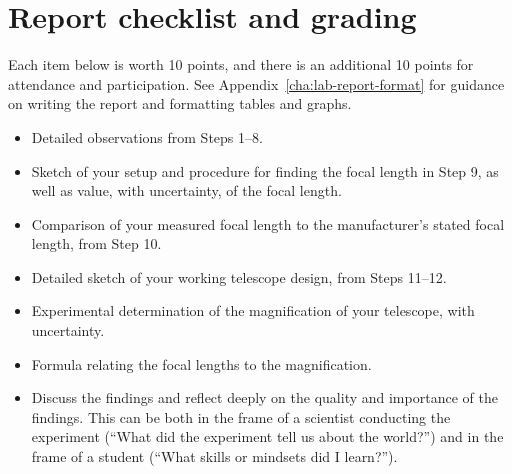 \section{Report checklist and grading}

Each item below is worth 10 points, and there is an additional 10 points for attendance and participation. See Appendix\ \ref{cha:lab-report-format} for guidance on writing the report and formatting tables and graphs.

\begin{itemize}
	\item Detailed observations from Steps 1--8.
	
	\item Sketch of your setup and procedure for finding the focal length in Step 9, as well as value, with uncertainty, of the focal length.
	
	\item Comparison of your measured focal length to the manufacturer's stated focal length, from Step 10.
	
	\item Detailed sketch of your working telescope design, from Steps 11--12.
	
	\item Experimental determination of the magnification of your telescope, with uncertainty.
	
	\item Formula relating the focal lengths to the magnification.
	
	\item Discuss the findings and reflect deeply on the quality and importance of the findings. This can be both in the frame of a scientist conducting the experiment (``What did the experiment tell us about the world?'') and in the frame of a student (``What skills or mindsets did I learn?'').
	
\end{itemize}
